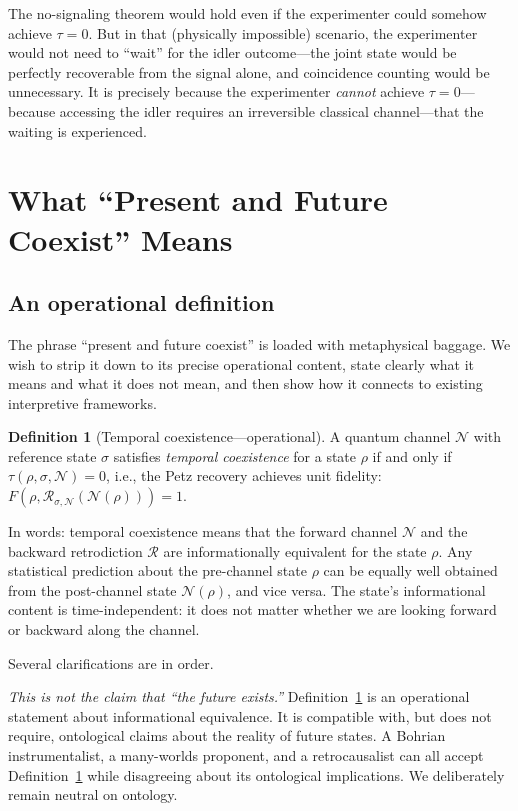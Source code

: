 \documentclass[12pt]{article}
\theoremstyle{definition}
\newtheorem{definition}[theorem]{Definition}
\theoremstyle{remark}
\newcommand{\Petz}{\mathcal{R}}
\newcommand{\chan}{\mathcal{N}}
\newcommand{\tauasym}{\tau}
\begin{document}
The no-signaling theorem would hold even if the experimenter could
somehow achieve $\tauasym = 0$.  But in that (physically impossible)
scenario, the experimenter would not need to ``wait'' for the
idler outcome---the joint state would be perfectly recoverable
from the signal alone, and coincidence counting would be
unnecessary.  It is precisely because the experimenter
\emph{cannot} achieve $\tauasym = 0$---because accessing the idler
requires an irreversible classical channel---that the waiting is
experienced.

\section{What ``Present and Future Coexist'' Means}
\label{sec:coexistence}

\subsection{An operational definition}

The phrase ``present and future coexist'' is loaded with
metaphysical baggage.  We wish to strip it down to its precise
operational content, state clearly what it means and what it does
not mean, and then show how it connects to existing interpretive
frameworks.

\begin{definition}[Temporal coexistence---operational]
\label{def:coexistence}
A quantum channel $\chan$ with reference state $\sigma$ satisfies
\emph{temporal coexistence} for a state $\rho$ if and only if
$\tauasym(\rho, \sigma, \chan) = 0$, i.e., the Petz recovery
achieves unit fidelity:
$F(\rho, \Petz_{\sigma,\chan}(\chan(\rho))) = 1$.
\end{definition}

In words: temporal coexistence means that the forward channel
$\chan$ and the backward retrodiction $\Petz$ are informationally
equivalent for the state $\rho$.  Any statistical prediction about
the pre-channel state $\rho$ can be equally well obtained from the
post-channel state $\chan(\rho)$, and vice versa.  The state's
informational content is time-independent: it does not matter
whether we are looking forward or backward along the channel.

Several clarifications are in order.

\emph{This is not the claim that ``the future exists.''}
Definition~\ref{def:coexistence} is an operational statement about
informational equivalence.  It is compatible with, but does not
require, ontological claims about the reality of future states.
A Bohrian instrumentalist, a many-worlds proponent, and a
retrocausalist can all accept Definition~\ref{def:coexistence}
while disagreeing about its ontological implications.  We
deliberately remain neutral on ontology.
\end{document}

